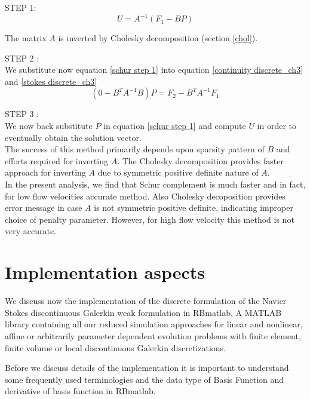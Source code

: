 \documentclass[a4paper,12pt]{book}
\begin{document}
STEP 1: \\ 
\begin{equation}\label{schur step 1}
U = A^{-1}(F_1 - BP) 
\end{equation}

The matrix $A$ is inverted by Cholesky decomposition (section \ref{chol}). 

STEP 2 : \\
We substitute now equation \eqref{schur step 1} into equation \eqref{continuity discrete_ch3} and \eqref{stokes discrete_ch3}
\begin{equation}\label{schur step 2}
(0 - B^T A^{-1} B) P = F_2 - B^T A^{-1} F_1
\end{equation}

STEP 3 : \\
We now back substitute $P$ in equation \eqref{schur step 1} and compute $U$ in order to eventually obtain the solution vector.
\\

The success of this method primarily depends upon sparsity pattern of $B$ and efforts required for inverting $A$. The Cholesky decomposition provides faster approach for inverting $A$ due to symmetric positive definite nature of $A$. \\

In the present analysis, we find that Schur complement is much faster and in fact, for low flow velocities accurate method. Also Cholesky decoposition provides error message in case $A$ is not symmetric positive definite, indicating improper choice of penalty parameter. However, for high flow velocity this method is not very accurate. 

\chapter{Implementation aspects} \label{implementation_aspects}

We discuss now the implementation of the discrete formulation of the Navier Stokes discontinuous Galerkin weak formulation in RBmatlab, A MATLAB library containing all our reduced simulation approaches for linear and nonlinear, affine or arbitrarily parameter dependent evolution problems with finite element, finite volume or local discontinuous Galerkin discretizations. \cite{Haasdonk_book} 

Before we discuss details of the implementation it is important to understand some frequently used terminologies and the data type of Basis Function and derivative of basis function in RBmatlab.
\end{document}
